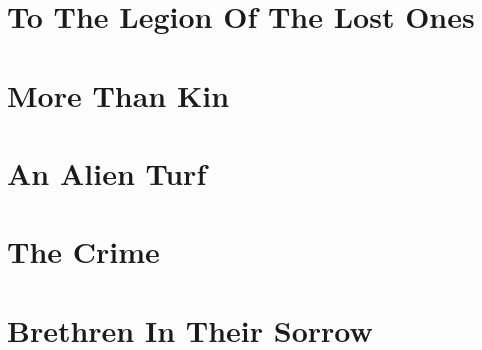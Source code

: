 \documentclass[draft,a5paper,12pt,twoside,onecolumn,openright,showtrim]{memoir}
\begin{document}
\clearforchapter

\mainmatter
\cleartorecto
\part{To The Legion Of The Lost Ones}

\clearforchapter

\cleartorecto
\part{More Than Kin}

\clearforchapter

\cleartorecto
\part{An Alien Turf}

\clearforchapter

\cleartorecto
\part{The Crime}

\clearforchapter

\cleartorecto
\part{Brethren In Their Sorrow}

\clearforchapter
\backmatter


\cleartorecto

\clearforchapter
\end{document}
